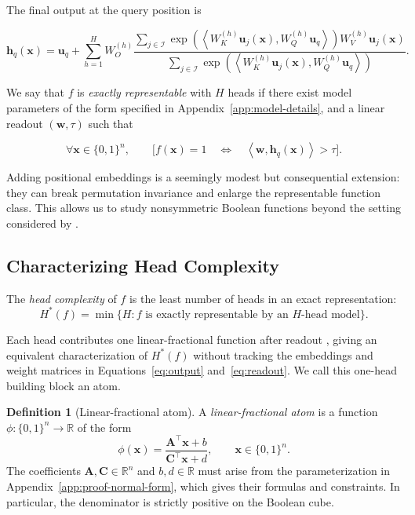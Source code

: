 \documentclass{article}
\theoremstyle{definition}
\newtheorem{definition}{Definition}
\theoremstyle{plain}
\newcommand{\hstar}{H^{\ast}}
\newcommand{\bits}{\{0,1\}}
\begin{document}
The final output at the query position is

\begin{equation}
\mathbf{h}_q(\mathbf{x})=\mathbf{u}_q+\sum_{h=1}^{H}
W_O^{(h)}
\frac{\sum_{j\in\mathcal{I}}
  \exp\!\left(\left\langle W_K^{(h)}\mathbf{u}_j(\mathbf{x}),W_Q^{(h)}\mathbf{u}_q\right\rangle\right)
  W_V^{(h)}\mathbf{u}_j(\mathbf{x})}
{\sum_{j\in\mathcal{I}}
  \exp\!\left(\left\langle W_K^{(h)}\mathbf{u}_j(\mathbf{x}),W_Q^{(h)}\mathbf{u}_q\right\rangle\right)}.
\label{eq:output}
\end{equation}

We say that $f$ is \emph{exactly representable} with $H$ heads if there exist model parameters of the form specified in Appendix~\ref{app:model-details}, and a linear readout $(\mathbf{w},\tau)$ such that

\begin{equation}
\forall\mathbf{x}\in\bits^n,\qquad
\bigl[f(\mathbf{x})=1 \quad\Longleftrightarrow\quad
\left\langle \mathbf{w},\mathbf{h}_q(\mathbf{x})\right\rangle>\tau\bigr].
\label{eq:readout}
\end{equation}

Adding positional embeddings is a seemingly modest but consequential extension: they can break permutation invariance and enlarge the representable function class. This allows us to study nonsymmetric Boolean functions beyond the setting considered by \citet{hsu2026attentionbased}.

\subsection{Characterizing Head Complexity}
The \emph{head complexity} of $f$ is the least number of heads in an exact representation:
\begin{equation}
\hstar(f)=\min\{H: f\text{ is exactly representable by an }H\text{-head model}\}.
\label{eq:hstar}
\end{equation}

Each head contributes one linear-fractional function after readout \citep{charnes1962programming}, giving an equivalent characterization of $\hstar(f)$ without tracking the embeddings and weight matrices in Equations~\eqref{eq:output} and~\eqref{eq:readout}. We call this one-head building block an atom.

\begin{definition}[Linear-fractional atom]
\label{def:atom}
A \emph{linear-fractional atom} is a function $\phi:\bits^n\to\mathbb{R}$ of the form
\begin{equation}
\phi(\mathbf{x})=\frac{\mathbf{A}^{\top}\mathbf{x}+b}{\mathbf{C}^{\top}\mathbf{x}+d},
\qquad \mathbf{x}\in\bits^n.
\label{eq:frac-atom}
\end{equation}
The coefficients $\mathbf{A},\mathbf{C}\in\mathbb{R}^n$ and $b,d\in\mathbb{R}$ must arise from the parameterization in Appendix~\ref{app:proof-normal-form}, which gives their formulas and constraints. In particular, the denominator is strictly positive on the Boolean cube.
\end{definition}
\smallskip
\end{document}

